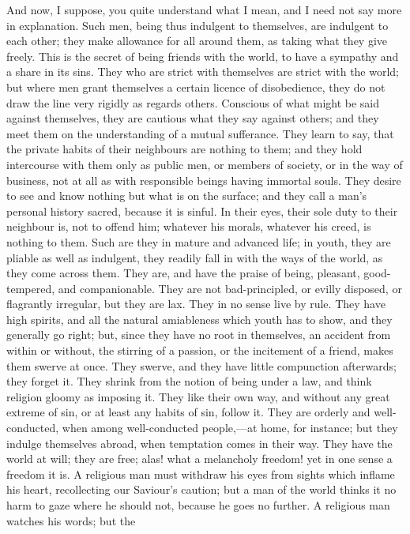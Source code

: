 And now, I suppose, you quite understand what I mean, and I need
not say more in explanation. Such men, being thus indulgent to
themselves, are indulgent to each other; they make allowance for all
around them, as taking what they give freely. This is the secret of
being friends with the world, to have a sympathy and a share in its
sins. They who are strict with themselves are strict with the world;
but where men grant themselves a certain licence of disobedience, they
do not draw the line very rigidly as regards others. Conscious of what
might be said against themselves, they are cautious what they say
against others; and they meet them on the understanding of a mutual
sufferance. They learn to say, that the private habits of their
neighbours are nothing to them; and they hold intercourse with them
only as public men, or members of society, or in the way of business,
not at all as with responsible beings having immortal souls. They
desire to see and know nothing but what is on the surface; and they
call a man's personal history sacred, because it is sinful. In their
eyes, their sole duty to their neighbour is, not to offend him;
whatever his morals, whatever his creed, is nothing to them. Such are
they in mature and advanced life; in youth, they are pliable as well
as indulgent, they readily fall in with the ways of the world, as they
come across them. They are, and have the praise of being, pleasant,
good-tempered, and companionable. They are not bad-principled, or
evilly disposed, or flagrantly irregular, but they are lax. They in no
sense live by rule. They have high spirits, and all the natural
amiableness which youth has to show, and they generally go right; but,
since they have no root in themselves, an accident from within or
without, the stirring of a passion, or the incitement of a friend,
makes them swerve at once. They swerve, and they have little
compunction afterwards; they forget it. They shrink from the notion of
being under a law, and think religion gloomy as imposing it. They like
their own way, and without any great extreme of sin, or at least any
habits of sin, follow it. They are orderly and well-conducted, when
among well-conducted people,—at home, for instance; but they indulge
themselves abroad, when temptation comes in their way. They have the
world at will; they are free; alas! what a melancholy freedom! yet in
one sense a freedom it is. A religious man must withdraw his eyes from
sights which inflame his heart, recollecting our Saviour's caution;
but a man of the world thinks it no harm to gaze where he should not,
because he goes no further. A religious man watches his words; but the
